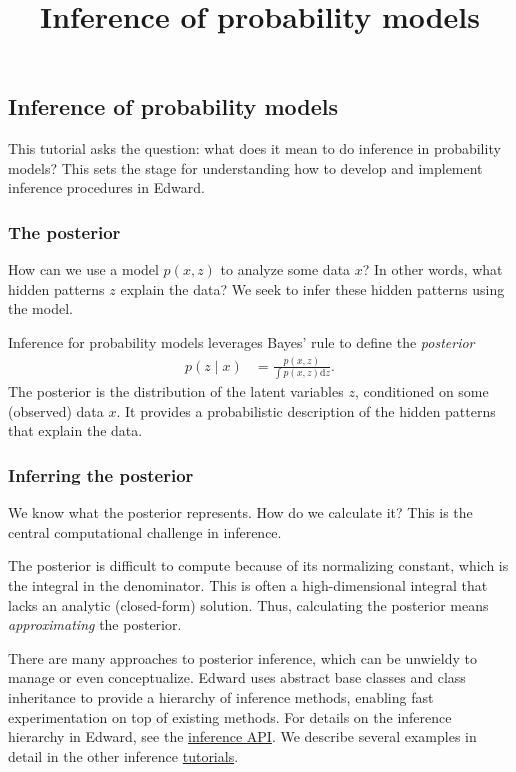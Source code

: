 \title{Inference of probability models}

\subsection{Inference of probability models}

This tutorial asks the question: what does it mean to do inference in
probability models? This sets the stage for understanding how to
develop and implement inference procedures in Edward.

\subsubsection{The posterior}

How can we use a model $p(x,z)$ to analyze some data $x$? In other words,
what hidden patterns $z$ explain the data? We seek to infer these
hidden patterns using the model.

Inference for probability models leverages Bayes' rule to define the
\emph{posterior}
\begin{align*}
  p(z \mid x)
  &=
  \frac{p(x,z)}{\int p(x,z) \text{d}z}.
\end{align*}
The posterior is the distribution of the latent variables $z$, conditioned on
some (observed) data $x$. It provides a probabilistic description of the hidden
patterns that explain the data.


\subsubsection{Inferring the posterior}

We know what the posterior represents. How do we calculate it? This is the
central computational challenge in inference.

The posterior is difficult to compute because of its normalizing
constant, which is the integral in the denominator.
This is often a high-dimensional integral that lacks an analytic (closed-form)
solution. Thus, calculating the posterior means \emph{approximating} the
posterior.

There are many approaches to posterior inference, which can be
unwieldy to manage or even conceptualize. Edward uses abstract base
classes and class inheritance to provide a hierarchy of inference
methods, enabling fast experimentation on top of existing
methods.  For details on the inference hierarchy in Edward, see the
\href{#}{inference API}.  We describe several examples in detail in
the other inference \href{tutorials.html}{tutorials}.

